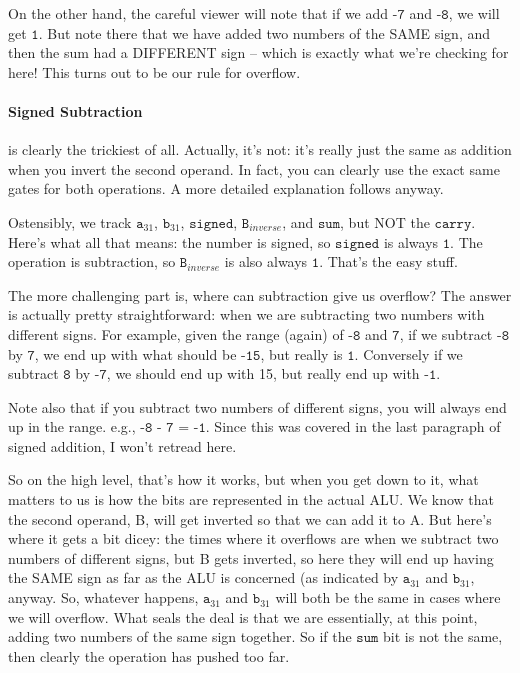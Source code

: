 \documentclass[a4paper]{article}
\begin{document}
On the other hand, the careful viewer will note that if we add $\texttt{-7}$ and $\texttt{-8}$, we will get $\texttt{1}$. But note there that we have added two numbers of the SAME sign, and then the sum had a DIFFERENT sign -- which is exactly what we're checking for here! This turns out to be our rule for overflow.

\paragraph*{Signed Subtraction} is clearly the trickiest of all. Actually, it's not: it's really just the same as addition when you invert the second operand. In fact, you can clearly use the exact same gates for both operations. A more detailed explanation follows anyway.

Ostensibly, we track $\texttt{a}_{31}$, $\texttt{b}_{31}$, $\texttt{signed}$, $\texttt{B}_{inverse}$, and $\texttt{sum}$, but NOT the $\texttt{carry}$. Here's what all that means: the number is signed, so $\texttt{signed}$ is always $\texttt{1}$. The operation is subtraction, so $\texttt{B}_{inverse}$ is also always $\texttt{1}$. That's the easy stuff.

The more challenging part is, where can subtraction give us overflow? The answer is actually pretty straightforward: when we are subtracting two numbers with different signs. For example, given the range (again) of $\texttt{-8}$ and $\texttt{7}$, if we subtract $\texttt{-8}$ by $\texttt{7}$, we end up with what should be $\texttt{-15}$, but really is $\texttt{1}$. Conversely if we subtract $\texttt{8}$ by $\texttt{-7}$, we should end up with 15, but really end up with $\texttt{-1}$.

Note also that if you subtract two numbers of different signs, you will always end up in the range. e.g., $\texttt{-8 - 7 = -1}$. Since this was covered in the last paragraph of signed addition, I won't retread here.

So on the high level, that's how it works, but when you get down to it, what matters to us is how the bits are represented in the actual ALU. We know that the second operand, B, will get inverted so that we can add it to A. But here's where it gets a bit dicey: the times where it overflows are when we subtract two numbers of different signs, but B gets inverted, so here they will end up having the SAME sign as far as the ALU is concerned (as indicated by $\texttt{a}_{31}$ and $\texttt{b}_{31}$, anyway. So, whatever happens, $\texttt{a}_{31}$ and $\texttt{b}_{31}$ will both be the same in cases where we will overflow. What seals the deal is that we are essentially, at this point, adding two numbers of the same sign together. So if the $\texttt{sum}$ bit is not the same, then clearly the operation has pushed too far.
\end{document}
